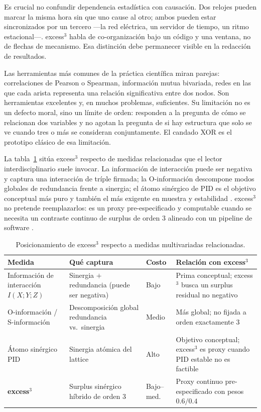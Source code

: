 \documentclass[11pt,a4paper]{article}
\begin{document}
Es crucial no confundir dependencia estad\'istica con causaci\'on. Dos
relojes pueden marcar la misma hora sin que uno cause al otro; ambos pueden
estar sincronizados por un tercero ---la red el\'ectrica, un servidor de
tiempo, un ritmo estacional---. excess$^3$ habla de co-organizaci\'on bajo un
c\'odigo y una ventana, no de flechas de mecanismo. Esa distinci\'on debe
permanecer visible en la redacci\'on de resultados.

Las herramientas m\'as comunes de la pr\'actica cient\'ifica miran parejas:
correlaciones de Pearson o Spearman, informaci\'on mutua bivariada, redes en
las que cada arista representa una relaci\'on significativa entre dos nodos.
Son herramientas excelentes y, en muchos problemas, suficientes. Su
limitaci\'on no es un defecto moral, sino un l\'imite de orden: responden a
la pregunta de c\'omo se relacionan dos variables y no agotan la pregunta de
si hay estructura que solo se ve cuando tres o m\'as se consideran
conjuntamente. El candado XOR es el prototipo cl\'asico de esa limitaci\'on.

La tabla~\ref{tab:compare} sit\'ua excess$^3$ respecto de medidas
relacionadas que el lector interdisciplinario suele invocar. La informaci\'on
de interacci\'on puede ser negativa y captura una interacci\'on de tr\'iple
firmada; la O-informaci\'on descompone modos globales de redundancia frente a
sinergia; el \'atomo sin\'ergico de PID es el objetivo conceptual m\'as puro y
tambi\'en el m\'as exigente en muestra y estabilidad
\citep{Williams2010,Rosas2019,McGill1954}. excess$^3$ no pretende
reemplazarlos: es un proxy pre-especificado y computable cuando se necesita
un contraste continuo de surplus de orden 3 alineado con un pipeline de
software \citep{Padilla2026excess3}.

\begin{table}[H]
\centering
\caption{Posicionamiento de excess$^3$ respecto a medidas multivariadas
relacionadas.}
\label{tab:compare}
\small
\begin{tabularx}{\textwidth}{@{}>{\raggedright\arraybackslash}p{2.8cm}
  >{\raggedright\arraybackslash}X
  >{\raggedright\arraybackslash}p{1.7cm}
  >{\raggedright\arraybackslash}X@{}}
\toprule
\textbf{Medida} & \textbf{Qu\'e captura} & \textbf{Costo} &
\textbf{Relaci\'on con excess$^3$} \\
\midrule
Informaci\'on de interacci\'on $I(X;Y;Z)$
  & Sinergia $+$ redundancia (puede ser negativa)
  & Bajo
  & Prima conceptual; excess$^3$ busca un surplus residual no negativo \\
O-informaci\'on / S-informaci\'on
  & Descomposici\'on global redundancia vs.\ sinergia
  & Medio
  & M\'as global; no fijada a orden exactamente 3 \\
\'Atomo sin\'ergico PID
  & Sinergia at\'omica del lattice
  & Alto
  & Objetivo conceptual; excess$^3$ es proxy cuando PID estable no es factible \\
\textbf{excess$^3$}
  & Surplus sin\'ergico h\'ibrido de orden 3
  & Bajo--med.
  & Proxy continuo pre-especificado con pesos $0.6/0.4$ \\
\bottomrule
\end{tabularx}
\end{table}
\end{document}
